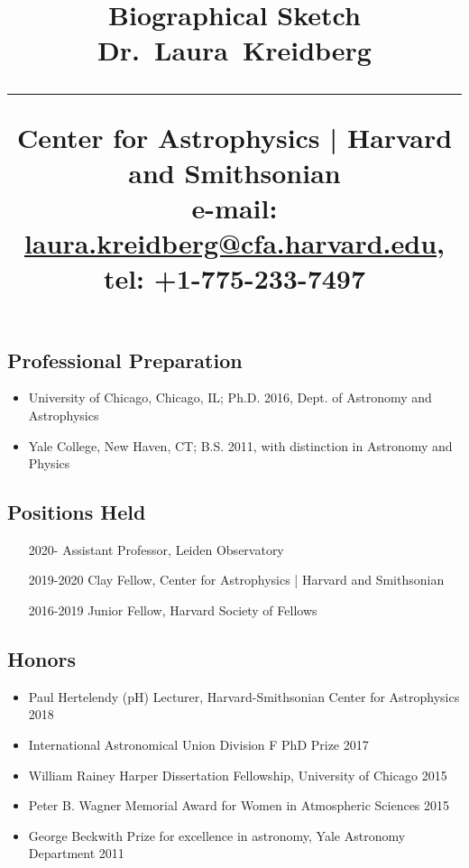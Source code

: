 \documentclass[11pt]{article}
\title{%
        \vspace{-2\baselineskip}
            \normalsize
            Biographical Sketch\\
            {\large\textbf{Dr.~Laura~Kreidberg}}\\
            \vspace{0.5\baselineskip}
            \hrule
            \vspace{0.5\baselineskip}
            Center for Astrophysics | Harvard and Smithsonian\\
            e-mail: \href{mailto:laura.kreidberg@cfa.harvard.edu}{laura.kreidberg@cfa.harvard.edu},
            tel: +1-775-233-7497
        \vspace{-1.5ex}
        }
\date{}
\author{}
\begin{document}
\maketitle
\vspace{-4\baselineskip}

\subsection{Professional Preparation}

\begin{itemize}
\item University of Chicago, Chicago, IL;
 Ph.D. 2016, Dept. of Astronomy and Astrophysics

\item Yale College, New Haven, CT;
 B.S. 2011, with distinction in Astronomy and Physics

\end{itemize}

\subsection{Positions Held}

\begin{itemize}[label={--9999:},leftmargin=*,itemsep=0pt]
    \item [2020-]{Assistant Professor}, Leiden Observatory
\item[2019-2020]{Clay Fellow}, Center for Astrophysics | Harvard and Smithsonian 
\item[2016-2019]{Junior Fellow}, Harvard Society of Fellows

\end{itemize}

\subsection{Honors}

\begin{itemize}[itemsep=0pt]

\item Paul Hertelendy (pH) Lecturer, Harvard-Smithsonian Center for Astrophysics \hfill 2018 
\item International Astronomical Union Division F PhD Prize \hfill 2017
\item William Rainey Harper Dissertation Fellowship, University of Chicago \hfill 2015
\item Peter B. Wagner Memorial Award for Women in Atmospheric Sciences \hfill 2015
\item George Beckwith Prize for excellence in astronomy, Yale Astronomy Department \hfill2011

\end{itemize}
\end{document}
